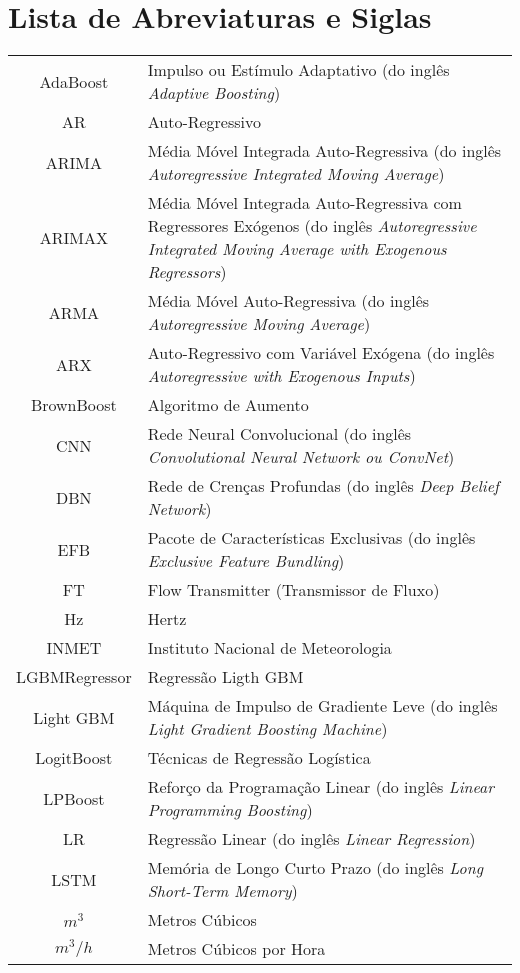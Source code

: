 \newpage
{}
\section*{Lista de Abreviaturas e Siglas}


\begin{tabular}{cp{}}
	AdaBoost & Impulso ou Estímulo Adaptativo (do inglês \textit{Adaptive Boosting}) \\
	AR & Auto-Regressivo\\
	ARIMA & Média Móvel Integrada Auto-Regressiva (do inglês \textit{Autoregressive Integrated Moving Average}) \\
	ARIMAX & Média Móvel Integrada Auto-Regressiva com Regressores Exógenos (do inglês \textit{Autoregressive Integrated Moving Average with Exogenous Regressors})\\
	ARMA & Média Móvel Auto-Regressiva (do inglês \textit{Autoregressive Moving Average}) \\
	ARX & Auto-Regressivo com Variável Exógena (do inglês \textit{Autoregressive with Exogenous Inputs})\\
	BrownBoost & Algoritmo de Aumento\\
	CNN & Rede Neural Convolucional (do inglês \textit{Convolutional Neural Network ou ConvNet})\\
	DBN & Rede de Crenças Profundas (do inglês \textit{Deep Belief Network}) \\
	EFB & Pacote de Características Exclusivas (do inglês \textit{Exclusive Feature Bundling})\\
	FT & Flow Transmitter (Transmissor de Fluxo)\\
	Hz & Hertz\\
	INMET & Instituto Nacional de Meteorologia\\
	LGBMRegressor & Regressão Ligth GBM\\
	Light GBM & Máquina de Impulso de Gradiente Leve (do inglês \textit{Light Gradient Boosting Machine}) \\
	LogitBoost & Técnicas de Regressão Logística\\
	LPBoost & Reforço da Programação Linear (do inglês \textit{Linear Programming Boosting}) \\
	LR & Regressão Linear (do inglês \textit{Linear Regression})\\
	LSTM & Memória de Longo Curto Prazo (do inglês \textit{Long Short-Term Memory})\\
	$m^3$ & Metros Cúbicos\\
	$m^3/h$ & Metros Cúbicos por Hora	
\end{tabular}

